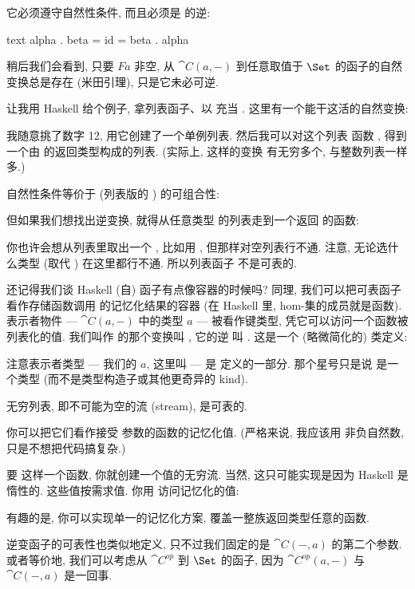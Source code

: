 它必须遵守自然性条件, 而且必须是  的逆:

\begin{snip}{text}
alpha . beta = id = beta . alpha
\end{snip}
稍后我们会看到, 只要 $F a$ 非空, 从 $\cat{C}(a, -)$ 到任意取值于
$\Set$ 的函子的自然变换总是存在 (米田引理), 只是它未必可逆.

让我用 Haskell 给个例子, 拿列表函子、以  充当 .
这里有一个能干这活的自然变换:

我随意挑了数字 12, 用它创建了一个单例列表. 然后我可以对这个列表 
函数 , 得到一个由  的返回类型构成的列表. (实际上, 这样的变换
有无穷多个, 与整数列表一样多.)

自然性条件等价于  (列表版的 ) 的可组合性:

但如果我们想找出逆变换, 就得从任意类型  的列表走到一个返回 
的函数:

你也许会想从列表里取出一个 , 比如用 , 但那样对空列表行不通.
注意, 无论选什么类型  (取代 ) 在这里都行不通. 所以列表函子
不是可表的.

还记得我们谈 Haskell (自) 函子有点像容器的时候吗? 同理, 我们可以把可表函子看作存储函数调用
的记忆化结果的容器 (在 Haskell 里, hom-集的成员就是函数). 表示者物件 ---
$\cat{C}(a, -)$ 中的类型 $a$ --- 被看作键类型, 凭它可以访问一个函数被列表化的值.
我们叫作  的那个变换叫 , 它的逆 
叫 . 这是一个 (略微简化的)  类定义:

注意表示者类型 --- 我们的 $a$, 这里叫  --- 是 
定义的一部分. 那个星号只是说  是一个类型 (而不是类型构造子或其他更奇异的
kind).

无穷列表, 即不可能为空的流 (stream), 是可表的.

你可以把它们看作接受  参数的函数的记忆化值. (严格来说, 我应该用
非负自然数, 只是不想把代码搞复杂.)

要  这样一个函数, 你就创建一个值的无穷流. 当然, 这只可能实现是因为
Haskell 是惰性的. 这些值按需求值. 你用  访问记忆化的值:

有趣的是, 你可以实现单一的记忆化方案, 覆盖一整族返回类型任意的函数.

逆变函子的可表性也类似地定义, 只不过我们固定的是 $\cat{C}(-, a)$ 的第二个参数.
或者等价地, 我们可以考虑从 $\cat{C}^{op}$ 到 $\Set$ 的函子, 因为
$\cat{C}^{op}(a, -)$ 与 $\cat{C}(-, a)$ 是一回事.

